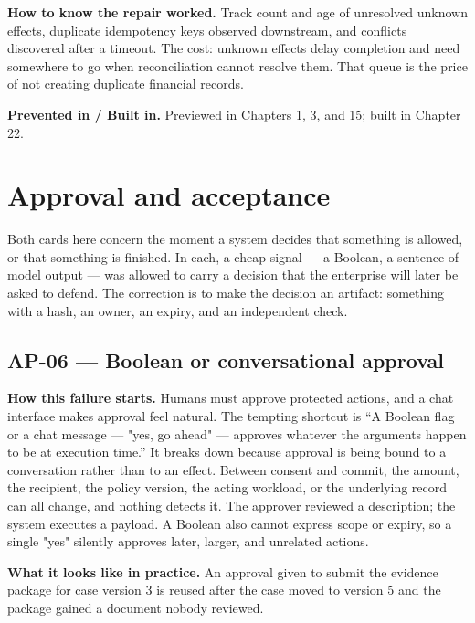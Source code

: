\textbf{How to know the repair worked.} Track count and age of unresolved unknown effects, duplicate idempotency keys observed downstream, and conflicts discovered after a timeout. The cost: unknown effects delay completion and need somewhere to go when reconciliation cannot resolve them. That queue is the price of not creating duplicate financial records.\par

\textbf{Prevented in / Built in.} Previewed in Chapters 1, 3, and 15; built in Chapter 22.\par

\section{Approval and acceptance}

Both cards here concern the moment a system decides that something is allowed, or that something is finished. In each, a cheap signal — a Boolean, a sentence of model output — was allowed to carry a decision that the enterprise will later be asked to defend. The correction is to make the decision an artifact: something with a hash, an owner, an expiry, and an independent check.\par


\subsection{AP-06 — Boolean or conversational approval}

\textbf{How this failure starts.} Humans must approve protected actions, and a chat interface makes approval feel natural. The tempting shortcut is “A Boolean flag or a chat message — "yes, go ahead" — approves whatever the arguments happen to be at execution time.” It breaks down because approval is being bound to a conversation rather than to an effect. Between consent and commit, the amount, the recipient, the policy version, the acting workload, or the underlying record can all change, and nothing detects it. The approver reviewed a description; the system executes a payload. A Boolean also cannot express scope or expiry, so a single "yes" silently approves later, larger, and unrelated actions.\par

\textbf{What it looks like in practice.} An approval given to submit the evidence package for case version 3 is reused after the case moved to version 5 and the package gained a document nobody reviewed.\par

